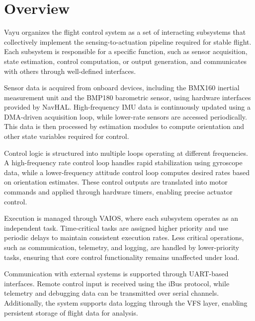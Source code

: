 \section{Overview}
\label{sec:vayu_overview}

Vayu organizes the flight control system as a set of interacting subsystems that collectively implement the sensing-to-actuation pipeline required for stable flight. Each subsystem is responsible for a specific function, such as sensor acquisition, state estimation, control computation, or output generation, and communicates with others through well-defined interfaces.

Sensor data is acquired from onboard devices, including the BMX160 inertial measurement unit and the BMP180 barometric sensor, using hardware interfaces provided by NavHAL. High-frequency IMU data is continuously updated using a DMA-driven acquisition loop, while lower-rate sensors are accessed periodically. This data is then processed by estimation modules to compute orientation and other state variables required for control.

Control logic is structured into multiple loops operating at different frequencies. A high-frequency rate control loop handles rapid stabilization using gyroscope data, while a lower-frequency attitude control loop computes desired rates based on orientation estimates. These control outputs are translated into motor commands and applied through hardware timers, enabling precise actuator control.

Execution is managed through VAIOS, where each subsystem operates as an independent task. Time-critical tasks are assigned higher priority and use periodic delays to maintain consistent execution rates. Less critical operations, such as communication, telemetry, and logging, are handled by lower-priority tasks, ensuring that core control functionality remains unaffected under load.

Communication with external systems is supported through UART-based interfaces. Remote control input is received using the iBus protocol, while telemetry and debugging data can be transmitted over serial channels. Additionally, the system supports data logging through the VFS layer, enabling persistent storage of flight data for analysis.
